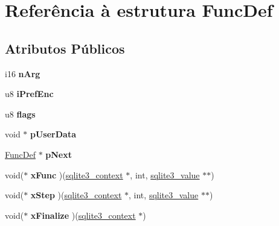 \hypertarget{struct_func_def}{\section{Referência à estrutura Func\-Def}
\label{struct_func_def}
}
\subsection*{Atributos Públicos}
\begin{DoxyCompactItemize}
\item 
\hypertarget{struct_func_def_a4ad90c05868ec8ee60c211b6e20299df}{i16 {\bfseries n\-Arg}}\label{struct_func_def_a4ad90c05868ec8ee60c211b6e20299df}

\item 
\hypertarget{struct_func_def_aa7ed0a0a7d8790a4946ef0dbf85a601c}{u8 {\bfseries i\-Pref\-Enc}}\label{struct_func_def_aa7ed0a0a7d8790a4946ef0dbf85a601c}

\item 
\hypertarget{struct_func_def_aed4dc88e58b7582668bcaf425c4d053f}{u8 {\bfseries flags}}\label{struct_func_def_aed4dc88e58b7582668bcaf425c4d053f}

\item 
\hypertarget{struct_func_def_a04fdde2f96be198823a483bebcfd3ae3}{void $\ast$ {\bfseries p\-User\-Data}}\label{struct_func_def_a04fdde2f96be198823a483bebcfd3ae3}

\item 
\hypertarget{struct_func_def_a1ebe547d000172d9ae44d12eeb433a48}{\hyperlink{struct_func_def}{Func\-Def} $\ast$ {\bfseries p\-Next}}\label{struct_func_def_a1ebe547d000172d9ae44d12eeb433a48}

\item 
\hypertarget{struct_func_def_a1cfd07fdfe22ff504ea7f36c0752c1da}{void($\ast$ {\bfseries x\-Func} )(\hyperlink{structsqlite3__context}{sqlite3\-\_\-context} $\ast$, int, \hyperlink{struct_mem}{sqlite3\-\_\-value} $\ast$$\ast$)}\label{struct_func_def_a1cfd07fdfe22ff504ea7f36c0752c1da}

\item 
\hypertarget{struct_func_def_ab1d1c623844534b17ea3ccce3f815464}{void($\ast$ {\bfseries x\-Step} )(\hyperlink{structsqlite3__context}{sqlite3\-\_\-context} $\ast$, int, \hyperlink{struct_mem}{sqlite3\-\_\-value} $\ast$$\ast$)}\label{struct_func_def_ab1d1c623844534b17ea3ccce3f815464}

\item 
\hypertarget{struct_func_def_a3c649453d5a58c697b7ee54ee999e7ef}{void($\ast$ {\bfseries x\-Finalize} )(\hyperlink{structsqlite3__context}{sqlite3\-\_\-context} $\ast$)}\label{struct_func_def_a3c649453d5a58c697b7ee54ee999e7ef}


\end{DoxyCompactItemize}
